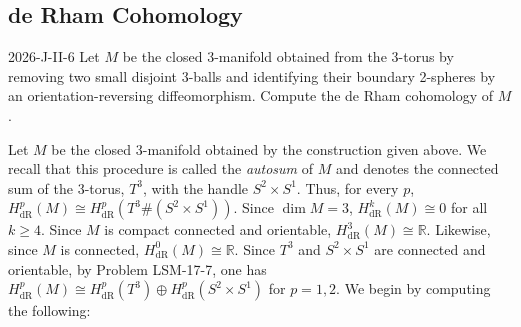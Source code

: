 \documentclass{article}
\begin{document}
	\newpage 
	\subsection{de Rham Cohomology}
	
	\begin{prb}{2026-J-II-6}
		Let $M$ be the closed 3-manifold obtained from the 3-torus by removing two small disjoint 3-balls and identifying their boundary 2-spheres by an orientation-reversing diffeomorphism. Compute the de Rham cohomology of $M$. 
	\end{prb}
	Let $M$ be the closed 3-manifold obtained by the construction given above. We recall that this procedure is called the \textit{autosum} of $M$ and denotes the connected sum of the 3-torus, $T^{3}$, with the handle $S^{2} \times S^{1}$. Thus, for every $p$, $H^{p}_{\text{dR}}(M) \cong H^{p}_{\text{dR}}(T^{3}\# (S^{2} \times S^{1}))$. Since $\dim{M} = 3$, $H^{k}_{\text{dR}}(M) \cong 0$ for all $k \geq 4$. Since $M$ is compact connected and orientable, $H^{3}_{\text{dR}}(M) \cong \mathbb{R}$. Likewise, since $M$ is connected, $H^{0}_{\text{dR}}(M) \cong \mathbb{R}$. Since $T^{3}$ and $S^{2}\times S^{1}$ are connected and orientable, by Problem LSM-17-7, one has $H^{p}_{\text{dR}}(M) \cong H^{p}_{\text{dR}}(T^{3}) \oplus H^{p}_{\text{dR}}(S^{2} \times S^{1})$ for $p = 1, 2$. We begin by computing the following: 
\end{document}
